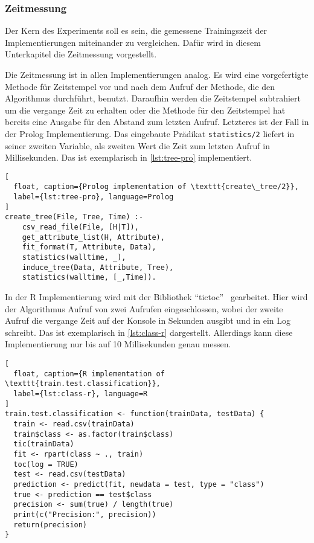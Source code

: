 \subsubsection{Zeitmessung}
Der Kern des Experiments soll es sein, die gemessene Trainingszeit der Implementierungen miteinander zu vergleichen.
Dafür wird in diesem Unterkapitel die Zeitmessung vorgestellt.

Die Zeitmessung ist in allen Implementierungen analog. Es wird eine vorgefertigte Methode für Zeitstempel
vor und nach dem Aufruf der Methode, die den Algorithmus durchführt, benutzt.
Daraufhin werden die Zeitstempel subtrahiert um die vergange Zeit zu erhalten oder die Methode für
den Zeitstempel hat bereits eine Ausgabe für den Abstand zum letzten Aufruf.
Letzteres ist der Fall in der Prolog Implementierung. Das eingebaute Prädikat \texttt{statistics/2}
liefert in seiner zweiten Variable, als zweiten Wert die Zeit zum letzten Aufruf in Millisekunden.
Das ist exemplarisch in \cref{lst:tree-pro} implementiert.

\begin{lstlisting}[
  float, caption={Prolog implementation of \texttt{create\_tree/2}},
  label={lst:tree-pro}, language=Prolog
]
create_tree(File, Tree, Time) :-
    csv_read_file(File, [H|T]),
    get_attribute_list(H, Attribute),
    fit_format(T, Attribute, Data),
    statistics(walltime, _),
    induce_tree(Data, Attribute, Tree),
    statistics(walltime, [_,Time]).
\end{lstlisting}

In der R Implementierung wird mit der Bibliothek \enquote{tictoc}~\cite{izrailev2014tictoc} gearbeitet.
Hier wird der Algorithmus Aufruf von zwei Aufrufen eingeschlossen, wobei der zweite Aufruf die vergange Zeit
auf der Konsole in Sekunden ausgibt und in ein Log schreibt. Das ist exemplarisch in \cref{lst:class-r} dargestellt.
Allerdings kann diese Implementierung nur bis auf 10 Millisekunden genau messen.
\begin{lstlisting}[
  float, caption={R implementation of \texttt{train.test.classification}},
  label={lst:class-r}, language=R
]
train.test.classification <- function(trainData, testData) {
  train <- read.csv(trainData)
  train$class <- as.factor(train$class)
  tic(trainData)
  fit <- rpart(class ~ ., train)
  toc(log = TRUE)
  test <- read.csv(testData)
  prediction <- predict(fit, newdata = test, type = "class")
  true <- prediction == test$class
  precision <- sum(true) / length(true)
  print(c("Precision:", precision))
  return(precision)
}
\end{lstlisting}

